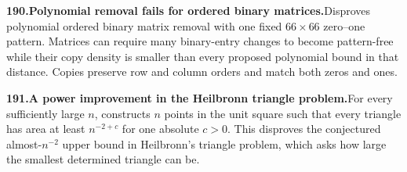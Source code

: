 \documentclass[11pt,a4paper]{article}
\begin{document}
  \par \begin{minipage}{\linewidth}
  \fontsize{10.5}{12.6}\selectfont\RaggedRight
  \hypertarget{result 190}{}
  {\bfseries\textcolor{muted}{190.}\enspace Polynomial removal fails for ordered binary matrices.}\enspace Disproves polynomial ordered binary matrix removal with one fixed $66\times66$ zero--one pattern. Matrices can require many binary-entry changes to become pattern-free while their copy density is smaller than every proposed polynomial bound in that distance. Copies preserve row and column orders and match both zeros and ones.\par
  \end{minipage}\par\vspace{5pt}



  \par \begin{minipage}{\linewidth}
  \fontsize{10.5}{12.6}\selectfont\RaggedRight
  \hypertarget{result 191}{}
  {\bfseries\textcolor{muted}{191.}\enspace A power improvement in the Heilbronn triangle problem.}\enspace For every sufficiently large $n$, constructs $n$ points in the unit square such that every triangle has area at least $n^{-2+c}$ for one absolute $c>0$. This disproves the conjectured almost-$n^{-2}$ upper bound in Heilbronn's triangle problem, which asks how large the smallest determined triangle can be.\par
  \end{minipage}\par\vspace{5pt}
\end{document}
